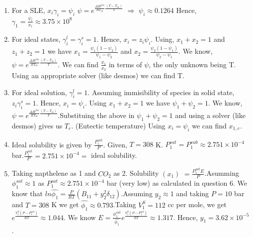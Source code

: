 \documentclass[12pt]{article}
\begin{document}
\begin{enumerate}[leftmargin=*]
\item For a SLE, $x_i\gamma_i=\psi_i$\newline
$\psi = e^{ \frac{\Delta H^{fus}}{RT_m} \frac{(T-T_m)}{T}}$ $\Rightarrow$ $\psi_i \approx  0.1264$\newline
Hence, $\gamma_1 = \displaystyle \frac{\psi_i}{x_i} \approx 3.75 \times 10^8$

\item For ideal states, $\gamma_i^l = \gamma_i^s = 1$.\newline
Hence, $x_i = z_i\psi_i$.\newline
Using, $x_1 + x_2 = 1$ and $z_1 + z_2 = 1$ we have $x_1 = \displaystyle \frac{\psi_1(1-\psi_2)}{\psi_1-\psi_2}$ and $x_2 = \displaystyle \frac{\psi_2(1-\psi_1)}{\psi_2-\psi_1}$.\newline
We know, $\psi = e^{ \frac{\Delta H^{fus}}{RT_m} \frac{(T-T_m)}{T}}$.\newline
We can find $\frac{x_1}{x_2}$ in terms of $\psi$, the only unknown being T. Using an appropriate solver (like desmos) we can find T.

\item For ideal solution,  $\gamma_i^l = 1$. Assuming immisibility of species in solid state, $z_i\gamma_i^s = 1$.\newline
Hence, $x_i = \psi_i$. Using $x_1 + x_2 = 1$ we have $\psi_1 + \psi_2 = 1$.\newline
We know, $\psi = e^{ \frac{\Delta H^{fus}}{RT_m} \frac{(T-T_m)}{T}}$.\newline Substituing the above in $\psi_1 + \psi_2 = 1$ and using a solver (like desmos) gives us $T_e$. (Eutectic temperature) \newline Using  $x_i = \psi_i$ we can find $x_{1,e}$.

\item Ideal solubility is given by $\displaystyle \frac{P_i^{sat}}{P}$. Given, $T = 308$ K. $P_1^{sat} = P_1^{sub} \approx 2.751 \times 10^{-4}$ bar.\newline $\displaystyle \frac{P_1^{sat}}{P} = 2.751 \times 10^{-4} = $ ideal solubility.

\item Taking napthelene as 1 and $CO_2$ as 2. Solubility $(x_1)$ $ = \displaystyle \frac{P_1^{sat}E}{P}$.\newline Asumming $\phi_1^{sat} \approx 1$ as $ P_1^{sat} \approx 2.751 \times 10^{-4}$ bar (very low) as calculated in question 6. \newline
We know that $ln\hat{\phi_1} = \frac{P}{RT}(B_{11} + y_2^2\delta_{12})$.\newline Assuming $y_2 \approx 1$ and taking $P = 10$ bar and $T = 308$ K we get $\hat{\phi_1} \approx 0.793$.\newline Taking $V_1^S = 112$ cc per mole, we get $e^{\frac{V_1^S(P-P_1^{sat})}{RT}} \approx 1.044$.\newline
We know $ E = \frac{\phi_1^{sat}}{\hat{\phi_1}} e^{\frac{V_1^S(P-P_1^{sat})}{RT}} \approx 1.317$. Hence, $y_1 = 3.62 \times 10^{-5}$.
\end{enumerate}
\end{document}
